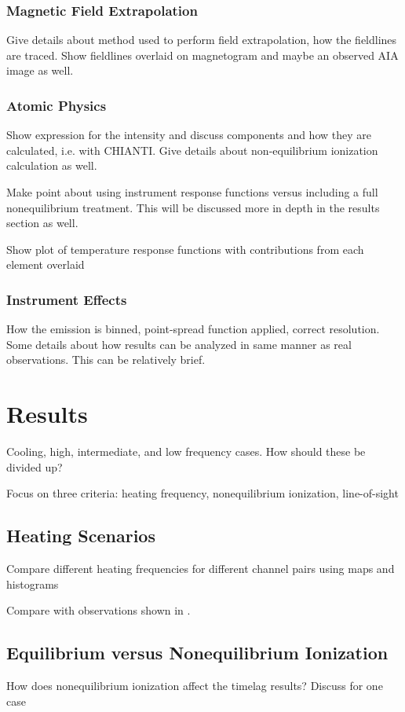\documentclass[modern,linenumbers]{aastex62}
\begin{document}
\subsubsection{Magnetic Field Extrapolation}
\label{field}
Give details about method used to perform field extrapolation, how the fieldlines are traced. Show fieldlines overlaid on magnetogram and maybe an
observed AIA image as well.

\subsubsection{Atomic Physics}
\label{atomic}
Show expression for the intensity and discuss components and how they are calculated, i.e. with CHIANTI. Give details about non-equilibrium ionization calculation as well.

Make point about using instrument response functions versus including a full nonequilibrium treatment. This will be discussed more in depth in the results section as well.

Show plot of temperature response functions with contributions from each element overlaid

\subsubsection{Instrument Effects}
\label{instrument}
How the emission is binned, point-spread function applied, correct resolution. Some details about how results can be analyzed in same manner as real observations. This can be relatively brief.

\section{Results}
\label{results}
Cooling, high, intermediate, and low frequency cases. How should these be divided up?

Focus on three criteria: heating frequency, nonequilibrium ionization, line-of-sight

\subsection{Heating Scenarios}
Compare different heating frequencies for different channel pairs using maps and histograms

Compare with observations shown in \citet{viall_survey_2017}.

\subsection{Equilibrium versus Nonequilibrium Ionization}
How does nonequilibrium ionization affect the timelag results? Discuss for one case
\end{document}
